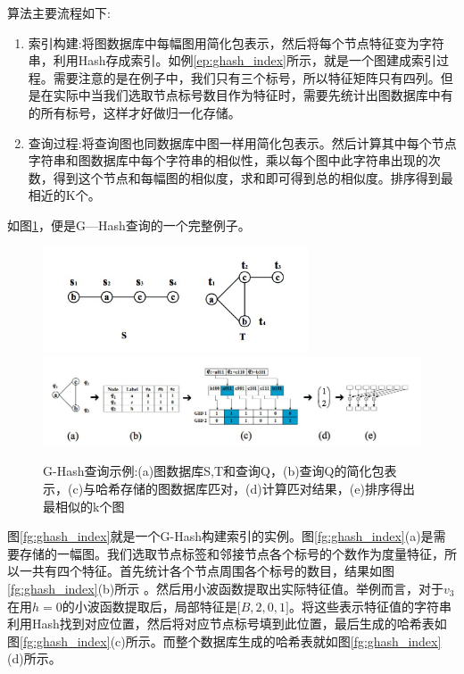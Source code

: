 \documentclass{XDBAthesis}
\begin{document}
算法主要流程如下:
\begin{enumerate}
    \item 索引构建:将图数据库中每幅图用简化包表示，然后将每个节点特征变为字符串，利用Hash存成索引。如例\ref{ep:ghash_index}所示，就是一个图建成索引过程。需要注意的是在例子中，我们只有三个标号，所以特征矩阵只有四列。但是在实际中当我们选取节点标号数目作为特征时，需要先统计出图数据库中有的所有标号，这样才好做归一化存储。
    \item 查询过程:将查询图也同数据库中图一样用简化包表示。然后计算其中每个节点字符串和图数据库中每个字符串的相似性，乘以每个图中此字符串出现的次数，得到这个节点和每幅图的相似度，求和即可得到总的相似度。排序得到最相近的K个。    
\end{enumerate}

如图\ref{fg:gHashExample}，便是G—Hash查询的一个完整例子。
\begin{figure}[htb]
    \centering
    \includegraphics[width=0.7\textwidth ]{../figures/ghashdatabase}
    \includegraphics[width=\textwidth ]{../figures/gHash+}
    \caption{G-Hash查询示例:(a)图数据库{S,T}和查询Q，(b)查询Q的简化包表示，(c)与哈希存储的图数据库匹对，(d)计算匹对结果，(e)排序得出最相似的k个图}
    \label{fg:gHashExample}
\end{figure}
\begin{exmp}
        图\ref{fg:ghash_index}就是一个G-Hash构建索引的实例。图\ref{fg:ghash_index}(a)是需要存储的一幅图。我们选取节点标签和邻接节点各个标号的个数作为度量特征，所以一共有四个特征。首先统计各个节点周围各个标号的数目，结果如图\ref{fg:ghash_index}(b)所示 。然后用小波函数提取出实际特征值。举例而言，对于$v_{3}$在用$h=0$的小波函数提取后，局部特征是$\lbrack B,2,0,1\rbrack $。将这些表示特征值的字符串利用Hash找到对应位置，然后将对应节点标号填到此位置，最后生成的哈希表如图\ref{fg:ghash_index}(c)所示。而整个数据库生成的哈希表就如图\ref{fg:ghash_index}(d)所示。
        \label{ep:ghash_index}
        
    \end{exmp}
    
\end{document}
